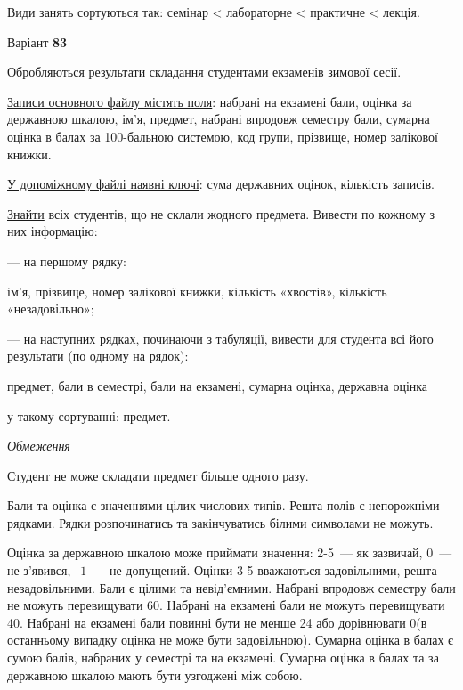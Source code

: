 \documentclass[11pt, ukrainian]{article}
\begin{document}
Види занять сортуються так: семінар < лабораторне < практичне < лекція.





\par
\newpage
{\center Варіант  \No \textbf { 83 }\par}
\bigskip
Обробляються результати складання студентами екзаменів зимової сесії.

\underline{Записи основного файлу містять поля}: набрані на екзамені бали, оцінка за державною шкалою, ім’я, предмет, набрані впродовж семестру бали, сумарна оцінка в балах за 100-бальною системою, код групи, прізвище, номер залікової книжки.

\underline{У допоміжному файлі наявні ключі}: сума державних оцінок, кількість записів.

\underline{Знайти} всіх студентів, що не склали жодного предмета. Вивести по кожному з них інформацію:\par
{\noindent}--- на першому рядку:\par
ім’я, прізвище, номер залікової книжки, кількість «хвостів», кількість «незадовільно»;

{\noindent}--- на наступних рядках, починаючи з табуляції, вивести для студента всі його результати (по одному на рядок):\par
предмет, бали в семестрі, бали на екзамені, сумарна оцінка, державна оцінка

{\noindent}у такому сортуванні: предмет.


\bigskip\textit{Обмеження}

Студент не може складати предмет більше одного разу.

Бали та оцінка є значеннями цілих числових типів. Решта полів є непорожніми рядками.
Рядки розпочинатись та закінчуватись білими символами не можуть.

Оцінка за державною шкалою може приймати значення: 2-5~--- як зазвичай, 0~--- не з’явився,$-1$~--- не допущений. 
Оцінки 3-5 вважаються задовільними, решта~--- незадовільними. 
Бали є цілими та невід’ємними.
Набрані впродовж семестру бали не можуть перевищувати 60. 
Набрані на екзамені бали не можуть перевищувати 40. 
Набрані на екзамені бали повинні бути не менше 24 або дорівнювати 0(в останньому випадку оцінка не може бути задовільною). 
Сумарна оцінка в балах є сумою балів, набраних у семестрі та на екзамені.
Сумарна оцінка в балах та за державною шкалою мають бути узгоджені між собою.
\end{document}
